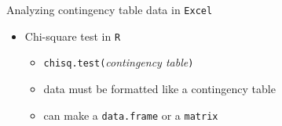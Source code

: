 \documentclass[
  ignorenonframetext,
  t]{beamer}
\newenvironment{Shaded}{\begin{snugshade}}{\end{snugshade}}
\newcommand{\CommentTok}[1]{\textcolor[rgb]{0.56,0.35,0.01}{\textit{#1}}}
\newcommand{\FloatTok}[1]{\textcolor[rgb]{0.00,0.00,0.81}{#1}}
\newcommand{\KeywordTok}[1]{\textcolor[rgb]{0.13,0.29,0.53}{\textbf{#1}}}
\newcommand{\NormalTok}[1]{#1}
\newcommand{\OperatorTok}[1]{\textcolor[rgb]{0.81,0.36,0.00}{\textbf{#1}}}
\providecommand{\tightlist}{%
  \setlength{\itemsep}{0pt}\setlength{\parskip}{0pt}}
\begin{document}
\begin{frame}[fragile]{Analyzing contingency table data in
\texttt{Excel}}
\protect\hypertarget{analyzing-contingency-table-data-in-6}{}

\begin{itemize}
\tightlist
\item
  Chi-square test in \texttt{R}

  \begin{itemize}
  \tightlist
  \item
    \texttt{chisq.test(}\emph{contingency table}\texttt{)}
  \item
    data must be formatted like a contingency table
  \item
    can make a \texttt{data.frame} or a \texttt{matrix}
  \end{itemize}
\end{itemize}

\scriptsize

\begin{Shaded}
\end{Shaded}

\end{frame}
\end{document}
